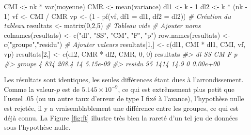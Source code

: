 \documentclass[
]{book}
\newenvironment{Shaded}{}{}
\newcommand{\AttributeTok}[1]{#1}
\newcommand{\CommentTok}[1]{\textit{#1}}
\newcommand{\DecValTok}[1]{#1}
\newcommand{\FunctionTok}[1]{#1}
\newcommand{\NormalTok}[1]{#1}
\newcommand{\OtherTok}[1]{#1}
\newcommand{\SpecialCharTok}[1]{#1}
\newcommand{\StringTok}[1]{#1}
\begin{document}
\begin{Shaded}
\begin{Highlighting}[]
\NormalTok{CMI }\OtherTok{\textless{}{-}}\NormalTok{ nk }\SpecialCharTok{*} \FunctionTok{var}\NormalTok{(moyenne)}
\NormalTok{CMR }\OtherTok{\textless{}{-}} \FunctionTok{mean}\NormalTok{(variance)}
\NormalTok{dl1 }\OtherTok{\textless{}{-}}\NormalTok{ k }\SpecialCharTok{{-}} \DecValTok{1}
\NormalTok{dl2 }\OtherTok{\textless{}{-}}\NormalTok{ k }\SpecialCharTok{*}\NormalTok{ (nk }\SpecialCharTok{{-}} \DecValTok{1}\NormalTok{)}
\NormalTok{vf }\OtherTok{\textless{}{-}}\NormalTok{ CMI }\SpecialCharTok{/}\NormalTok{ CMR }
\NormalTok{vp }\OtherTok{\textless{}{-}}\NormalTok{ (}\DecValTok{1} \SpecialCharTok{{-}} \FunctionTok{pf}\NormalTok{(vf, }\AttributeTok{df1 =}\NormalTok{ dl1, }\AttributeTok{df2 =}\NormalTok{ dl2)) }
\CommentTok{\# Création du tableau}
\NormalTok{resultats }\OtherTok{\textless{}{-}} \FunctionTok{matrix}\NormalTok{(}\DecValTok{0}\NormalTok{,}\DecValTok{2}\NormalTok{,}\DecValTok{5}\NormalTok{) }\CommentTok{\# Tableau vide}
\CommentTok{\# Ajouter noms}
\FunctionTok{colnames}\NormalTok{(resultats)  }\OtherTok{\textless{}{-}} \FunctionTok{c}\NormalTok{(}\StringTok{"dl"}\NormalTok{, }\StringTok{"SS"}\NormalTok{, }\StringTok{"CM"}\NormalTok{, }\StringTok{"F"}\NormalTok{, }\StringTok{"p"}\NormalTok{)}
\FunctionTok{row.names}\NormalTok{(resultats) }\OtherTok{\textless{}{-}} \FunctionTok{c}\NormalTok{(}\StringTok{"groupe"}\NormalTok{,}\StringTok{"residu"}\NormalTok{)}
\CommentTok{\# Ajouter valeurs}
\NormalTok{resultats[}\DecValTok{1}\NormalTok{,] }\OtherTok{\textless{}{-}} \FunctionTok{c}\NormalTok{(dl1, CMI }\SpecialCharTok{*}\NormalTok{ dl1, CMI, vf, vp)}
\NormalTok{resultats[}\DecValTok{2}\NormalTok{,] }\OtherTok{\textless{}{-}} \FunctionTok{c}\NormalTok{(dl2, CMR }\SpecialCharTok{*}\NormalTok{ dl2, CMR, }\DecValTok{0}\NormalTok{, }\DecValTok{0}\NormalTok{)}
\NormalTok{resultats}
\CommentTok{\#\textgreater{}        dl   SS    CM  F        p}
\CommentTok{\#\textgreater{} groupe  4  834 208.4 14 5.15e{-}09}
\CommentTok{\#\textgreater{} residu 95 1414  14.9  0 0.00e+00}
\end{Highlighting}
\end{Shaded}

Les résultats sont identiques, les seules différences étant dues à l'arrondissement. Comme la valeur-\(p\) est de \ensuremath{5.145\times 10^{-9}}, ce qui est extrêmement plus petit que l'usuel .05 (ou un autre taux d'erreur de type I fixé à l'avance), l'hypothèse nulle est rejetée, il y a vraisemblablement une différence entre les groupes, ce qui est déjà connu. La Figure \ref{fig:ft} illustre très bien la rareté d'un tel jeu de données sous l'hypothèse nulle.
\end{document}
